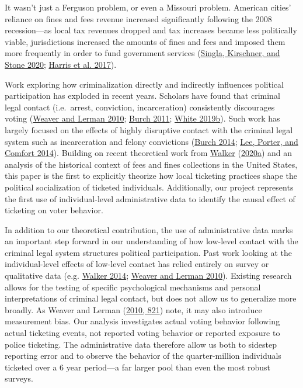 \documentclass[
  12pt,
]{article}
\begin{document}
It wasn't just a Ferguson problem, or even a Missouri problem. American cities' reliance on fines and fees revenue increased significantly following the 2008 recession---as local tax revenues dropped and tax increases became less politically viable, jurisdictions increased the amounts of fines and fees and imposed them more frequently in order to fund government services (\protect\hyperlink{ref-Singla2020}{Singla, Kirschner, and Stone 2020}; \protect\hyperlink{ref-Harris2017}{Harris et al. 2017}).

Work exploring how criminalization directly and indirectly influences political participation has exploded in recent years. Scholars have found that criminal legal contact (i.e.~arrest, conviction, incarceration) consistently discourages voting (\protect\hyperlink{ref-Weaver2010}{Weaver and Lerman 2010}; \protect\hyperlink{ref-Burch2011}{Burch 2011}; \protect\hyperlink{ref-White2019a}{White 2019b}). Such work has largely focused on the effects of highly disruptive contact with the criminal legal system such as incarceration and felony convictions (\protect\hyperlink{ref-Burch2014}{Burch 2014}; \protect\hyperlink{ref-Lee2014}{Lee, Porter, and Comfort 2014}). Building on recent theoretical work from \protect\hyperlink{ref-Walker2020a}{Walker} (\protect\hyperlink{ref-Walker2020a}{2020a}) and an analysis of the historical context of fees and fines collections in the United States, this paper is the first to explicitly theorize how local ticketing practices shape the political socialization of ticketed individuals. Additionally, our project represents the first use of individual-level administrative data to identify the causal effect of ticketing on voter behavior.

In addition to our theoretical contribution, the use of administrative data marks an important step forward in our understanding of how low-level contact with the criminal legal system structures political participation. Past work looking at the individual-level effects of low-level contact has relied entirely on survey or qualitative data (e.g. \protect\hyperlink{ref-Walker2014}{Walker 2014}; \protect\hyperlink{ref-Weaver2010}{Weaver and Lerman 2010}). Existing research allows for the testing of specific psychological mechanisms and personal interpretations of criminal legal contact, but does not allow us to generalize more broadly. As Weaver and Lerman (\protect\hyperlink{ref-Weaver2010}{2010, 821}) note, it may also introduce measurement bias. Our analysis investigates actual voting behavior following actual ticketing events, not reported voting behavior or reported exposure to police ticketing. The administrative data therefore allow us both to sidestep reporting error and to observe the behavior of the quarter-million individuals ticketed over a 6 year period---a far larger pool than even the most robust surveys.
\end{document}
